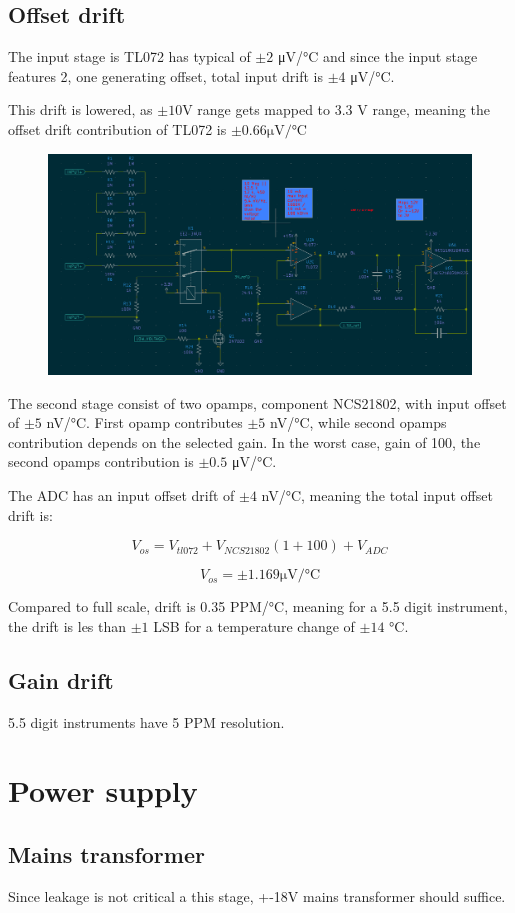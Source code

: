 \documentclass[11pt]{article}
\begin{document}
\subsection{Offset drift}

The input stage is TL072 has typical of $\pm 2$ \si{\micro \volt / \celsius} and 
since the input stage features 2, one generating offset, total input 
drift is $\pm 4$ \si{\micro \volt / \celsius}. 

This drift is lowered, as $\pm 10 \si{\volt}$ range gets mapped to 3.3 \si{\volt}
range, meaning the offset drift contribution of TL072 is 
$\pm0.66  \si{\micro \volt / \celsius}$

\begin{figure}[H]
  \centering 
  \includegraphics[scale=0.55]{"./figs/Input_amp.png"}
\end{figure}


The second stage consist of two opamps, component NCS21802,
with input offset of $\pm 5$ \si{\nano \volt / \celsius}. First opamp
contributes $\pm 5$ \si{\nano \volt / \celsius}, while second opamps
contribution depends on the selected gain. In the worst case, gain of 
100, the second opamps contribution is $\pm 0.5$ \si{\micro \volt / \celsius}.

The ADC has an input offset drift of $\pm 4$ \si{\nano \volt / \celsius},
meaning the total input offset drift is: 

\begin{equation}
  V_{os} = V_{tl072} + V_{NCS21802} (1 + 100) + V_{ADC}
  \label{eq:offset_1}
\end{equation}

\begin{equation}
  V_{os} = \pm 1.169 \si{\micro \volt / \celsius}
  \label{eq:offset_2}
\end{equation}

Compared to full scale, drift is 0.35 \si{PPM/\celsius},
meaning for a 5.5 digit instrument, the drift is 
les than $\pm1$ LSB for a temperature change of
$\pm 14$ \si{\celsius}.

\subsection{Gain drift}
5.5 digit instruments have 5 PPM resolution.

\pagebreak
\section{Power supply}

\subsection{Mains transformer}
Since leakage is not critical a this stage, +-18V mains transformer should suffice.
\end{document}

